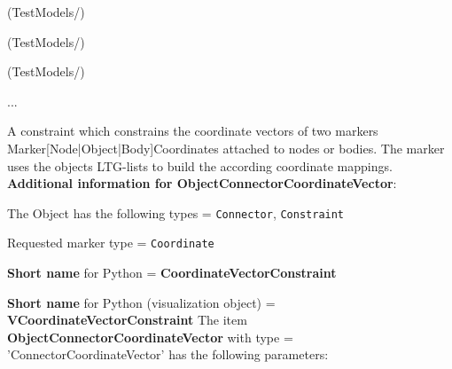\item {} (TestModels/)
\item {} (TestModels/)
\item {} (TestModels/)
\item  ...

\ei

%
\newpage

\label{sec:item:ObjectConnectorCoordinateVector}
A constraint which constrains the coordinate vectors of two markers Marker[Node|Object|Body]Coordinates attached to nodes or bodies. The marker uses the objects \ac{LTG}-lists to build the according coordinate mappings.\vspace{12pt}
 \\{\bf Additional information for ObjectConnectorCoordinateVector}:
\bi
  \item The Object has the following types = \texttt{Connector}, \texttt{Constraint}
  \item Requested marker type = \texttt{Coordinate}
  \item {\bf Short name} for Python = {\bf CoordinateVectorConstraint}  \item {\bf Short name} for Python (visualization object) = {\bf VCoordinateVectorConstraint}\ei
\vspace{12pt} \noindent The item {\bf ObjectConnectorCoordinateVector} with type = 'ConnectorCoordinateVector' has the following parameters:\vspace{-1cm}\\ 
